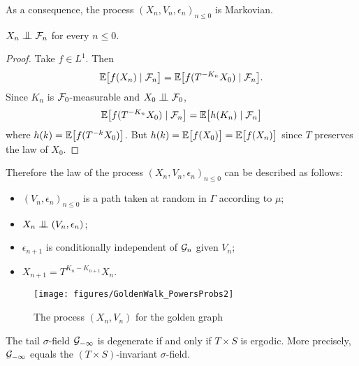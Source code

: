 \documentclass[12pt,a4paper]{article}
\begin{document}
As a consequence, the process ${(X_n, V_n, \epsilon_n)}_{n \leq 0}$ is Markovian. 


\begin{lemma}\label{lemma:independence}
$X_n \indep \FF_n$ for every $n \leq 0$.
\end{lemma}

\begin{proof}
Take $f \in L^1$. Then
$$
\mathbb{E}\bigl[ f(X_n) \mid \mathcal{F}_n\bigr] 
= \mathbb{E}\bigl[ f(T^{-K_n}X_0) \mid \mathcal{F}_n\bigr]. 
$$
Since $K_n$ is $\mathcal{F}_0$-measurable and $X_0 \indep \FF_0$, 
$$
\mathbb{E}\bigl[ f(T^{-K_n}X_0) \mid \mathcal{F}_n\bigr] = 
\mathbb{E}\bigl[ h(K_n) \mid \mathcal{F}_n\bigr]
$$
where $h(k) = \mathbb{E}\bigl[ f(T^{-k}X_0)\bigr]$. 
But $h(k) =   \mathbb{E}\bigl[ f(X_0)\bigr]=  \mathbb{E}\bigl[ f(X_n)\bigr]$ 
since $T$ preserves the law of $X_0$. 
\end{proof}

Therefore the law of the process ${(X_n,V_n,\epsilon_n)}_{n \leq 0}$ can 
be described as follows:
\begin{itemize}
\item ${(V_n,\epsilon_n)}_{n \leq 0}$ is a path taken at random in $\Gamma$ 
according to $\mu$;

\item $X_n \indep (V_n,\epsilon_n)$;

\item $\epsilon_{n+1}$ is conditionally independent of $\mathcal{G}_n$ given $V_n$;

\item $X_{n+1} = T^{K_n-K_{n+1}}X_n$.
\end{itemize}


\begin{figure}[!h]
\centering
	\texttt{[image: figures/GoldenWalk\_PowersProbs2]}
\caption{The process $(X_n, V_n)$ for the golden graph}
\end{figure}

\begin{ppsition}\label{ppsition:tailfield}
The tail $\sigma$-field $\mathcal{G}_{-\infty}$ is degenerate if and only if $T \times S$ is ergodic. 
More precisely, $\mathcal{G}_{-\infty}$ equals  the $(T\times S)$-invariant $\sigma$-field. 
\end{ppsition}
 
\end{document}

